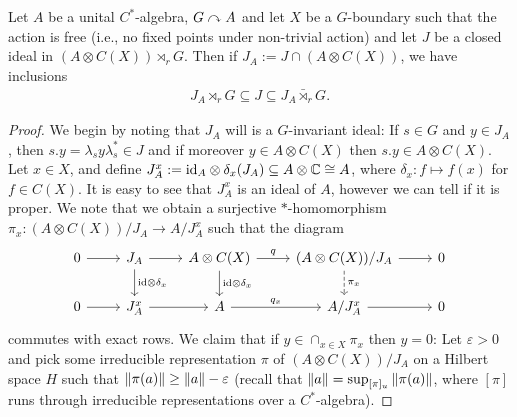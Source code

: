 \begin{proposition}
	Let $A$ be a unital $C^*$-algebra, $G \stackrel{}{\curvearrowright} {A}$ and let $X$ be a $G$-boundary such that the action is free (i.e., no fixed points under non-trivial action) and let $J$ be a closed ideal in $(A \otimes C(X)) \rtimes_r G$. Then if $J_A := J \cap (A \otimes C(X))$, we have inclusions
	\begin{align*}
		 J_A \rtimes_r G \subseteq J \subseteq J_A \bar \rtimes_r G.
	\end{align*}
	\label{ozawprop18}
\end{proposition}
\begin{proof}
	We begin by noting that $J_A$ will is a $G$-invariant ideal: If $s \in G$ and $y \in J_A$, then $s.y = \lambda_s y \lambda_s^*  \in J$ and if moreover $y \in A \otimes C(X)$ then $s.y \in A \otimes C(X)$. Let $x \in X$, and define $J_A^x := \mathrm{id}_A \otimes \delta_x(J_A) \subseteq A \otimes \mathbb{C} \cong A$, where $\delta_x \colon f \mapsto f(x)$ for $f \in C(X)$. It is easy to see that $J_A^x$ is an ideal of $A$, however we can tell if it is proper. We note that we obtain a surjective $*$-homomorphism $\pi_x \colon (A \otimes C(X)) / J_A \to A / J_A^x$ such that the diagram
	\begin{equation*}
		\begin{tikzcd}
			0 \ar[r] & J_A \ar[r] \ar[d, "\mathrm{id}\otimes \delta_x"] & A \otimes C(X) \ar[d, "\mathrm{id}\otimes \delta_x"] \ar[r,"q"] &(A \otimes C(X)) /J_A \ar[r] \ar[d,dashed, "\pi_x"] & 0\\
			0 \ar[r] & J_A^x \ar[r] & A \ar[r, "q_x"] & A/J_A^x \ar[r] & 0
		\end{tikzcd}
	\end{equation*}
	commutes with exact rows. We claim that if $y \in \cap_{x \in X} \pi_x$ then $y = 0$: Let $\varepsilon > 0$ and pick some irreducible representation $\pi$ of $(A \otimes C(X))/J_A$ on a Hilbert space $H$ such that $\left\lVert \pi(a) \right\rVert \geq \left\lVert a \right\rVert - \varepsilon$ (recall that $\left\lVert a \right\rVert = \sup_{[\pi]_u} \left\lVert \pi(a)\right\rVert$, where $[\pi]$ runs through irreducible representations over a $C^*$-algebra).
	

\end{proof}

